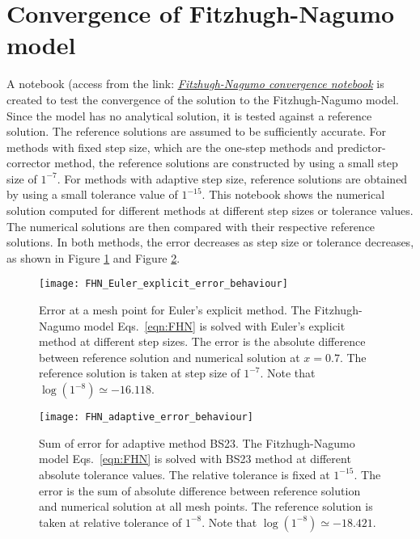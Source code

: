 \section{Convergence of Fitzhugh-Nagumo model}
\label{sec:FHN-convergence}
A notebook (access from the link: \href{https://nbviewer.jupyter.org/github/FarmHJ/numerical-solver/blob/main/examples/fhn_model_convergence.ipynb}{\underline{\emph{Fitzhugh-Nagumo convergence notebook}}} is created to test the convergence of the solution to the Fitzhugh-Nagumo model. Since the model has no analytical solution, it is tested against a reference solution. The reference solutions are assumed to be sufficiently accurate. For methods with fixed step size, which are the one-step methods and predictor-corrector method, the reference solutions are constructed by using a small step size of $1^{-7}$. For methods with adaptive step size, reference solutions are obtained by using a small tolerance value of $1^{-15}$. This notebook shows the numerical solution computed for different methods at different step sizes or tolerance values. The numerical solutions are then compared with their respective reference solutions. In both methods, the error decreases as step size or tolerance decreases, as shown in Figure \ref{fig:Euler_explicit_error} and Figure \ref{fig:adaptive_error}.

\begin{figure}
    \texttt{[image: FHN\_Euler\_explicit\_error\_behaviour]}
    \caption{Error at a mesh point for Euler's explicit method. The Fitzhugh-Nagumo model Eqs.~\eqref{eqn:FHN} is solved with Euler's explicit method at different step sizes. The error is the absolute difference between reference solution and numerical solution at $x=0.7$. The reference solution is taken at step size of $1^{-7}$. Note that $\log(1^{-8})\simeq-16.118$.}
    \label{fig:Euler_explicit_error}
 \end{figure}
\begin{figure}
   \texttt{[image: FHN\_adaptive\_error\_behaviour]}
   \caption{Sum of error for adaptive method BS23. The Fitzhugh-Nagumo model Eqs.~\eqref{eqn:FHN} is solved with BS23 method at different absolute tolerance values. The relative tolerance is fixed at $1^{-15}$. The error is the sum of absolute difference between reference solution and numerical solution at all mesh points. The reference solution is taken at relative tolerance of $1^{-8}$. Note that $\log(1^{-8})\simeq-18.421$.}
   \label{fig:adaptive_error}
\end{figure}